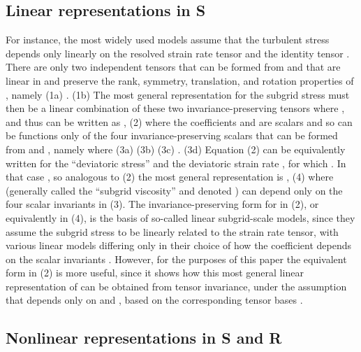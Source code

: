 \subsection{Linear representations in S} 

For instance, the most widely used models assume that the turbulent stress depends only linearly on the resolved strain rate tensor   and the identity tensor  . There are only two independent tensors that can be formed from   and   that are linear in   and preserve the rank, symmetry, translation, and rotation properties of  , namely
  	(1a)
   . 	(1b)
The most general representation for the subgrid stress must then be a linear combination of these two invariance-preserving tensors   where  , and thus can be written as 
   ,                                              (2)
where the coefficients   and   are scalars and so can be functions only of the four invariance-preserving scalars that can be formed from   and  , namely   where 
	  	(3a)
	  	(3b)
	  	(3c)
	 .      	(3d)
Equation (2) can be equivalently written for the “deviatoric stress”   and the deviatoric strain rate  , for which  .  In that case  , so analogous to (2) the most general representation is
 ,                                                     (4)
where   (generally called the “subgrid viscosity” and denoted  ) can depend only on the four scalar invariants   in (3). The invariance-preserving form for   in (2), or equivalently in (4), is the basis of so-called linear subgrid-scale models, since they assume the subgrid stress to be linearly related to the strain rate tensor, with various linear models differing only in their choice of how the coefficient   depends on the scalar invariants  .  However, for the purposes of this paper the equivalent form in (2) is more useful, since it shows how this most general linear representation of   can be obtained from tensor invariance, under the assumption that   depends only on   and  , based on the corresponding tensor bases  . 
 

\subsection{Nonlinear representations in S and R} 

